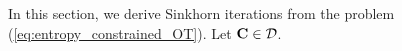 




In this section, we derive Sinkhorn iterations from the problem (\ref{eq:entropy_constrained_OT}). Let $\mathbf{C} \in \mathcal{D}$. 

